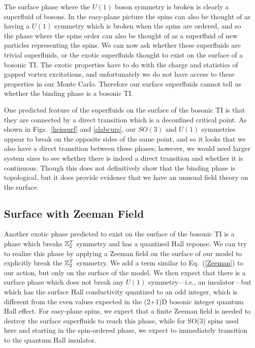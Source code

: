 The surface phase where the $U(1)$ boson symmetry is broken is clearly a superfluid of bosons. In the easy-plane picture the spins can also be thought of as having a $U(1)$ symmetry which is broken when the spins are ordered, and so the phase where the spins order can also be thought of as a superfluid of new particles representing the spins. We can now ask whether these superfluids are trivial superfluids, or the exotic superfluids thought to exist on the surface of a bosonic TI.\cite{SenthilVishwanath} The exotic properties have to do with the charge and statistics of gapped vortex excitations, and unfortunately we do not have access to these properties in our Monte Carlo. Therefore our surface superfluids cannot tell us whether the binding phase is a bosonic TI.

One predicted feature of the superfluids on the surface of the bosonic TI is that they are connected by a direct transition which is a deconfined critical point.\cite{SenthilVishwanath} As shown in Figs.~\ref{heissurf} and \ref{slabcurs}, our $SO(3)$ and $U(1)$ symmetries appear to break on the opposite sides of the same point, and so it looks that we also have a direct transition between these phases; however, we would need larger system sizes to see whether there is indeed a direct transition and whether it is continuous.
Though this does not definitively show that the binding phase is topological, but it does provide evidence that we have an unusual field theory on the surface.


\subsection{Surface with Zeeman Field}
Another exotic phase predicted to exist on the surface of the bosonic TI is a phase which breaks $\mathbb{Z}_2^T$ symmetry and has a quantized Hall reponse. We can try to realize this phase by applying a Zeeman field on the surface of our model to explicitly break the $\mathbb{Z}_2^T$ symmetry. We add a term similar to Eq.~(\ref{Zeeman}) to our action, but only on the surface of the model. We then expect that there is a surface phase which does not break any $U(1)$ symmetry---i.e., an insulator---but which has the surface Hall conductivity quantized to an odd integer, which is different from the even values expected in the (2+1)D bosonic integer quantum Hall effect. For easy-plane spins, we expect that a finite Zeeman field is needed to destroy the surface superfluids to reach this phase, while for SO(3) spins used here and starting in the spin-ordered phase, we expect to immediately transition to the quantum Hall insulator.\cite{LesikAshvin}

